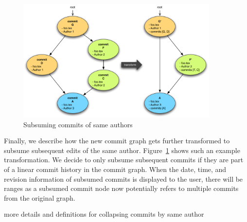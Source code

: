 \begin{figure}
\centering
\includegraphics[width=0.9\textwidth]{./figures/git-commit-history3b}
\caption{Subsuming commits of same authors} \label{fig:git-commit3b}
\end{figure}

Finally, we describe how the new commit graph gets further transformed to subsume subsequent edits of the same author. Figure~\ref{fig:git-commit3b} shows such an example transformation.  We decide to only subsume subsequent commits if they are part of a linear commit history in the commit graph.  When the date, time, and revision information of subsumed commits is displayed to the user, there will be ranges as a subsumed commit node now potentially refers to multiple commits from the original graph.

more details and definitions for collapsing commits by same author



